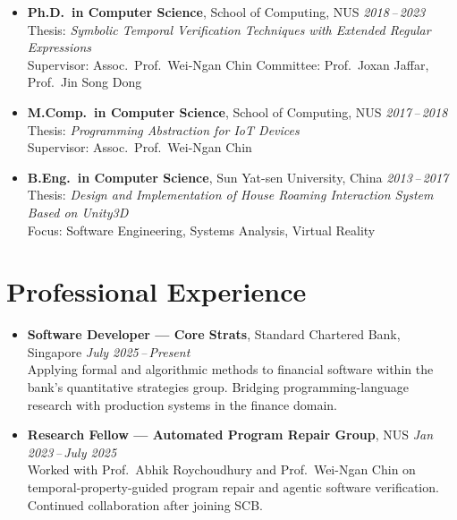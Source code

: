 \documentclass[11pt, a4paper]{article}
\begin{document}
\begin{itemize}[leftmargin=0pt, label={}]

  \item \textbf{Ph.D.\ in Computer Science}, School of Computing, NUS
        \hfill \textit{2018\,--\,2023}\\
  Thesis: \emph{Symbolic Temporal Verification Techniques with Extended Regular Expressions}\\
  Supervisor: Assoc.\ Prof.\ Wei-Ngan Chin \qquad
  Committee: Prof.\ Joxan Jaffar, Prof.\ Jin Song Dong

  \item \textbf{M.Comp.\ in Computer Science}, School of Computing, NUS
        \hfill \textit{2017\,--\,2018}\\
  Thesis: \emph{Programming Abstraction for IoT Devices}\\
  Supervisor: Assoc.\ Prof.\ Wei-Ngan Chin

  \item \textbf{B.Eng.\ in Computer Science}, Sun Yat-sen University, China
        \hfill \textit{2013\,--\,2017}\\
  Thesis: \emph{Design and Implementation of House Roaming Interaction System Based on Unity3D}\\
  Focus: Software Engineering, Systems Analysis, Virtual Reality

\end{itemize}

\section{Professional Experience}

\begin{itemize}[leftmargin=0pt, label={}]

  \item \textbf{Software Developer --- Core Strats}, Standard Chartered Bank, Singapore
        \hfill \textit{July 2025\,--\,Present}\\
  Applying formal and algorithmic methods to financial software within the bank's quantitative
  strategies group. Bridging programming-language research with production systems in the finance
  domain.

  \item \textbf{Research Fellow --- Automated Program Repair Group},
        NUS
        \hfill \textit{Jan 2023\,--\,July 2025}\\
  Worked with Prof.\ Abhik Roychoudhury and Prof.\ Wei-Ngan Chin on temporal-property-guided program repair
 and agentic software verification. Continued collaboration after
  joining SCB.

\end{itemize}
\end{document}

